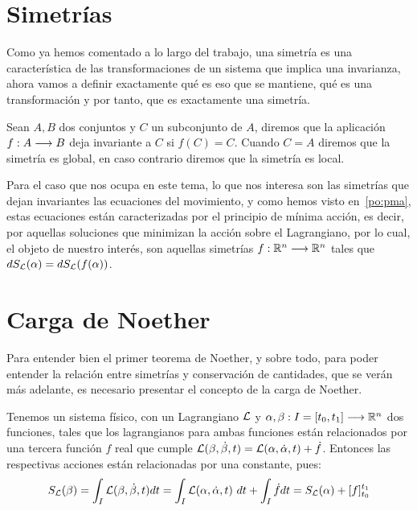 \section{Simetrías}\label{sec:simetrias}
Como ya hemos comentado a lo largo del trabajo, una simetría es una característica de las transformaciones de un sistema que implica una invarianza, ahora vamos a definir exactamente qué es eso que se mantiene, qué es una transformación y por tanto, que es exactamente una simetría.

Sean $A, B$ dos conjuntos y $C$ un subconjunto de $A$, diremos que la aplicación $f:A\longrightarrow B$ deja invariante a $C$ si $f(C)=C$.
Cuando $C=A$ diremos que la simetría es global, en caso contrario diremos que la simetría es local.

Para el caso que nos ocupa en este tema, lo que nos interesa son las simetrías que dejan invariantes las ecuaciones del movimiento, y como hemos visto en~\eqref{po:pma}, estas ecuaciones están caracterizadas por el principio de mínima acción, es decir, por aquellas soluciones que minimizan la acción sobre el Lagrangiano, por lo cual, el objeto de nuestro interés, son aquellas simetrías $f:\mathbb{R}^n\longrightarrow \mathbb{R}^n$ tales que $dS_{\mathcal{L}}(\alpha)=dS_{\mathcal{L}}(f(\alpha))$.

\section{Carga de Noether}\label{sec:carga-de-noether}
Para entender bien el primer teorema de Noether, y sobre todo, para poder entender la relación entre simetrías y conservación de cantidades, que se verán más adelante, es necesario presentar el concepto de la carga de Noether.

Tenemos un sistema físico, con un Lagrangiano $\mathcal{L}$ y $\alpha,\beta:I=[t_0, t_1]\longrightarrow \mathbb{R}^n$ dos funciones, tales que los lagrangianos para ambas funciones están relacionados por una tercera función $f$ real que cumple $\mathcal{L}(\beta, \dot{\beta}, t) = \mathcal{L}(\alpha, \dot{\alpha}, t)+\dot{f}$.
Entonces las respectivas acciones están relacionadas por una constante, pues:
\begin{equation}
	\label{eq:variacion-accion}
	S_{\mathcal{L}}(\beta) = \int_I \mathcal{L}(\beta, \dot{\beta}, t) dt = \int_I \mathcal{L}(\alpha, \dot{\alpha}, t)\ dt+\int_I \dot{f}dt=S_{\mathcal{L}}(\alpha) +[f]_{t_0}^{t_1}
\end{equation}

